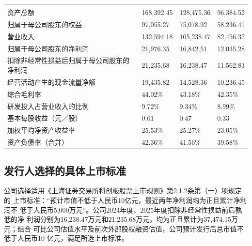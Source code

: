 \begin{gstab}
\begin{longtable}{|L{49mm}|R{29mm}|R{29mm}|R{29mm}|}
\hline
{} &  &  &  \\ \hline
\endfirsthead
\hline
{} &  &  &  \\ \hline
\endhead
资产总额 & 168,392.45 & 128,475.36 & 96,384.52 \\ \hline
归属于母公司股东的权益 & 97,055.27 & 75,078.92 & 58,236.41 \\ \hline
营业收入 & 132,594.18 & 105,238.47 & 82,456.32 \\ \hline
归属于母公司股东的净利润 & 21,976.35 & 16,842.51 & 12,035.28 \\ \hline
扣除非经常性损益后归属于母公司股东的净利润 & 21,235.68 & 16,238.47 & 11,562.83 \\ \hline
经营活动产生的现金流量净额 & 19,435.82 & 14,528.36 & 10,236.45 \\ \hline
综合毛利率 & 44.02\% & 43.18\% & 42.35\% \\ \hline
研发投入占营业收入的比例 & 9.72\% & 9.34\% & 8.99\% \\ \hline
基本每股收益（元／股） & 0.61 & 0.47 & 0.33 \\ \hline
加权平均净资产收益率 & 25.53\% & 25.27\% & 23.05\% \\ \hline
资产负债率（合并） & 42.36\% & 41.56\% & 39.58\% \\ \hline
\end{longtable}
\end{gstab}

\subsection{发行人选择的具体上市标准}

公司选择适用《上海证券交易所科创板股票上市规则》第2.1.2条第（一）项规定的
上市标准：``预计市值不低于人民币10亿元，最近两年净利润均为正且累计净利润不
低于人民币5,000万元''。公司2024年度、2025年度扣除非经常性损益前后孰低的净
利润分别为16,238.47万元和21,235.68万元，均为正且累计为37,474.15万元；结合
可比公司估值水平及前次外部股权融资估值，公司预计发行后总市值不低于人民币10
亿元，满足所选上市标准。

